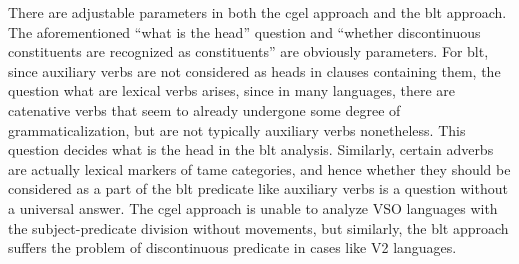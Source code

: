 \documentclass{article}
\begin{document}
There are adjustable parameters in both the \ac{cgel} approach and the \ac{blt} approach.
The aforementioned ``what is the head'' question 
and ``whether discontinuous constituents are recognized as constituents''
are obviously parameters.
For \ac{blt}, since auxiliary verbs are not considered as heads in clauses containing them,
the question what are lexical verbs arises,
since in many languages, 
there are catenative verbs that seem to already undergone some degree of grammaticalization,
but are not typically auxiliary verbs nonetheless.
This question decides what is the head in the \ac{blt} analysis.
Similarly, certain adverbs are actually lexical markers of \ac{tame} categories,
and hence whether they should be considered as a part of the \ac{blt} predicate like auxiliary verbs
is a question without a universal answer.
The \ac{cgel} approach is unable to analyze VSO languages 
with the subject-predicate division without movements,
but similarly, the \ac{blt} approach suffers the problem of discontinuous predicate
in cases like V2 languages.
\end{document}
